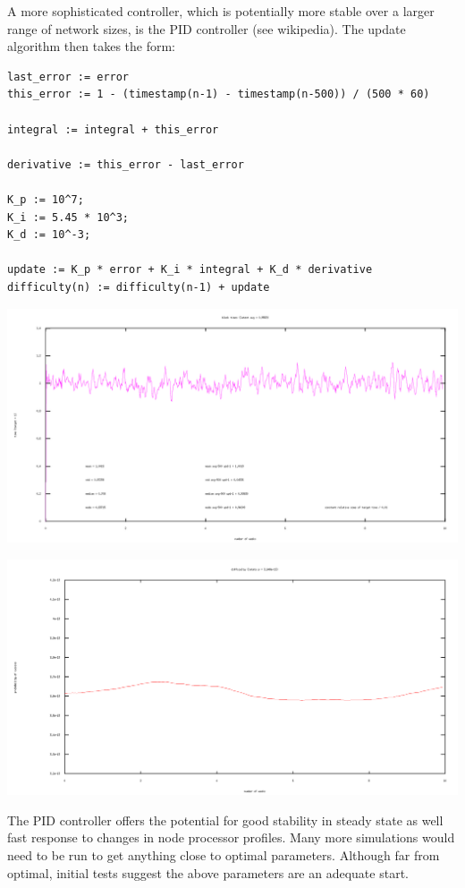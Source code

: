 \documentclass[10pt,a4paper]{article}
\begin{document}
\newpage

A more sophisticated controller, which is potentially more stable over a larger range of network sizes, is the PID controller (see wikipedia). The update algorithm then takes the form:

\begin{verbatim}
last_error := error
this_error := 1 - (timestamp(n-1) - timestamp(n-500)) / (500 * 60)

integral := integral + this_error

derivative := this_error - last_error

K_p := 10^7;
K_i := 5.45 * 10^3;
K_d := 10^-3;

update := K_p * error + K_i * integral + K_d * derivative
difficulty(n) := difficulty(n-1) + update
\end{verbatim}

\includegraphics[width=14cm]{SimulationGraphs/simulation_avg-500_upd-1_PID.png}

\includegraphics[width=14cm]{SimulationGraphs/simulation_avg-500_upd-1_PID_diff.png}

The PID controller offers the potential for good stability in steady state as well fast response to changes in node processor profiles. Many more simulations would need to be run to get anything close to optimal parameters. Although far from optimal, initial tests suggest the above parameters are an adequate start.
\end{document}
